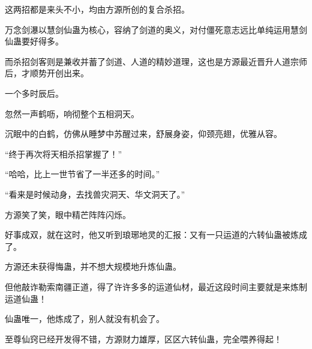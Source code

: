 \begin{this_body}
这两招都是来头不小，均由方源所创的复合杀招。

万念剑瀑以慧剑仙蛊为核心，容纳了剑道的奥义，对付僵死意志远比单纯运用慧剑仙蛊要好得多。

而杀招剑客则是兼收并蓄了剑道、人道的精妙道理，这也是方源最近晋升人道宗师后，才顺势开创出来。

一个多时辰后。

忽然一声鹤呖，响彻整个五相洞天。

沉眠中的白鹤，仿佛从睡梦中苏醒过来，舒展身姿，仰颈亮翅，优雅从容。

“终于再次将天相杀招掌握了！”

“哈哈，比上一世节省了一半还多的时间。”

“看来是时候动身，去找兽灾洞天、华文洞天了。”

方源笑了笑，眼中精芒阵阵闪烁。

好事成双，就在这时，他又听到琅琊地灵的汇报：又有一只运道的六转仙蛊被炼成了。

方源还未获得悔蛊，并不想大规模地升炼仙蛊。

但他敲诈勒索南疆正道，得了许许多多的运道仙材，最近这段时间主要就是来炼制运道仙蛊！

仙蛊唯一，他炼成了，别人就没有机会了。

至尊仙窍已经开发得不错，方源财力雄厚，区区六转仙蛊，完全喂养得起！

\end{this_body}

